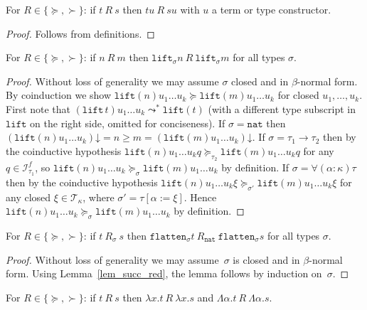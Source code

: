 \documentclass[a4paper,UKenglish,cleveref,autoref,numberwithinsect]{lipics-v2019}
\theoremstyle{definition}
\newcommand{\Iterms}{\mathcal{I}}
\newcommand{\arrtype}{\rightarrow}
\newcommand{\subst}[2]{#1:=#2}
\newcommand{\abs}[2]{\lambda #1.#2}
\newcommand{\tabs}[2]{\Lambda #1.#2}
\newcommand{\nat}{\mathtt{nat}}
\newcommand{\flatten}{\mathtt{flatten}}
\newcommand{\lift}{\mathtt{lift}}
\newcommand{\Tc}{\mathcal{T}}
\newcommand{\da}{\mathord{\downarrow}}
\begin{document}
\begin{lemma}\label{lem_app_succ}
  For $R \in \{\succeq,\succ\}$: if $t\:R\:s$ then $t u\:R\:s u$ with
  $u$ a term or type constructor.
\end{lemma}

\begin{proof}
  Follows from definitions.
\end{proof}

\begin{lemma}\label{lem:liftgreater}
  For $R \in \{\succeq,\succ\}$: if $n\:R\:m$ then
  $\lift_\sigma n\:R\:\lift_\sigma m$ for all types $\sigma$.
\end{lemma}

\begin{proof}
  Without loss of generality we may assume $\sigma$ closed and in
  $\beta$-normal form. By coinduction we show
  $\lift(n) u_1 \ldots u_k \succeq \lift(m) u_1 \ldots u_k$ for closed
  $u_1,\ldots,u_k$. First note that
  $(\lift\,t) u_1 \ldots u_k \leadsto^* \lift(t)$ (with a different
  type subscript in~$\lift$ on the right side, omitted for
  conciseness). If $\sigma = \nat$ then
  $(\lift(n) u_1 \ldots u_k)\da = n \ge m = (\lift(m) u_1 \ldots
  u_k)\da$. If $\sigma = \tau_1\arrtype\tau_2$ then by the coinductive
  hypothesis
  $\lift(n) u_1 \ldots u_k q \succeq_{\tau_2} \lift(m) u_1 \ldots u_k
  q$ for any $q \in \Iterms^f_{\tau_1}$, so
  $\lift(n) u_1 \ldots u_k \succeq_{\sigma} \lift(m) u_1 \ldots u_k$
  by definition. If $\sigma = \forall(\alpha:\kappa)\tau$ then by the
  coinductive hypothesis
  $\lift(n) u_1 \ldots u_k \xi \succeq_{\sigma'} \lift(m) u_1 \ldots
  u_k \xi$ for any closed $\xi \in \Tc_\kappa$, where
  $\sigma' = \tau[\subst{\alpha}{\xi}]$. Hence
  $\lift(n) u_1 \ldots u_k \succeq_{\sigma} \lift(m) u_1 \ldots u_k$
  by definition.
\end{proof}

\begin{lemma}\label{lem_flatten_succ}
  For $R \in \{\succeq,\succ\}$: if $t\:R_\sigma\:s$ then
  $\flatten_\sigma t\:R_\nat\: \flatten_\sigma s$ for all types
  $\sigma$.
\end{lemma}

\begin{proof}
  Without loss of generality we may assume~$\sigma$ is closed and in
  $\beta$-normal form. Using Lemma~\ref{lem_succ_red}, the lemma
  follows by induction on~$\sigma$.
\end{proof}

\begin{lemma}\label{lem_abs_succ}
  For $R \in \{\succeq,\succ\}$: if $t\:R\:s$ then
  $\abs{x}{t}\:R\:\abs{x}{s}$ and
  $\tabs{\alpha}{t}\:R\:\tabs{\alpha}{s}$.
\end{lemma}
\end{document}
